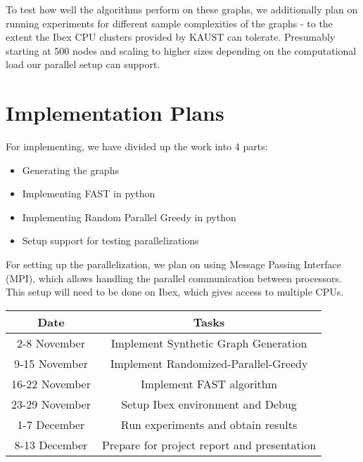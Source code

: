 \documentclass[11pt, a4paper]{article}
\begin{document}
To test how well the algorithms perform on these graphs, we additionally plan on running experiments for different sample complexities of the graphs - to the extent the Ibex CPU clusters provided by KAUST can tolerate. Presumably starting at 500 nodes and scaling to higher sizes depending on the computational load our parallel setup can support.

\section{Implementation Plans}

For implementing, we have divided up the work into 4 parts:

\begin{itemize}
    \item Generating the graphs
    \item Implementing FAST in python
    \item Implementing Random Parallel Greedy in python
    \item Setup support for testing parallelizations
\end{itemize}

For setting up the parallelization, we plan on using Message Passing Interface (MPI), which allows handling the parallel communication between processors. This setup will need to be done on Ibex, which gives access to multiple CPUs.

\begin{center}
\begin{tabular}{||c c||} 
 \hline
 Date & Tasks \\
 \hline\hline
 2-8 November & Implement Synthetic Graph Generation  \\ 
 \hline
 9-15 November & Implement Randomized-Parallel-Greedy \\
 \hline
 16-22 November & Implement FAST algorithm  \\
 \hline
 23-29 November & Setup Ibex environment and Debug  \\
 \hline
 1-7 December & Run experiments and obtain results  \\
 \hline
 8-13 December & Prepare for project report and presentation  \\
 \hline
\end{tabular}
\end{center}
\end{document}
